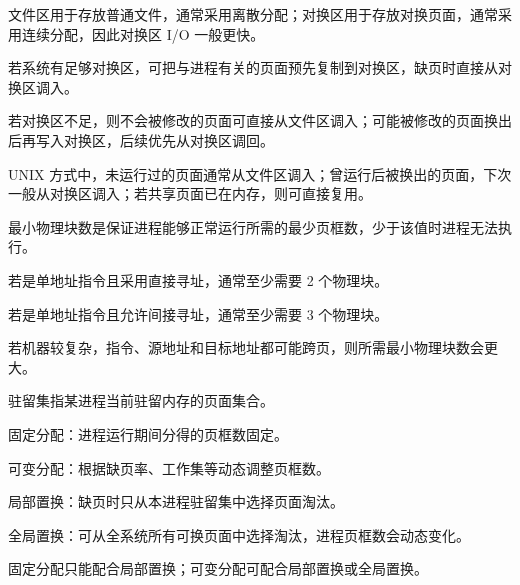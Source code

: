 \begin{points}
  \item 文件区用于存放普通文件，通常采用离散分配；对换区用于存放对换页面，通常采用连续分配，因此对换区 I/O 一般更快。
  \item 若系统有足够对换区，可把与进程有关的页面预先复制到对换区，缺页时直接从对换区调入。
  \item 若对换区不足，则不会被修改的页面可直接从文件区调入；可能被修改的页面换出后再写入对换区，后续优先从对换区调回。
  \item UNIX 方式中，未运行过的页面通常从文件区调入；曾运行后被换出的页面，下次一般从对换区调入；若共享页面已在内存，则可直接复用。
\end{points}

\begin{points}
  \item 最小物理块数是保证进程能够正常运行所需的最少页框数，少于该值时进程无法执行。
  \item 若是单地址指令且采用直接寻址，通常至少需要 2 个物理块。
  \item 若是单地址指令且允许间接寻址，通常至少需要 3 个物理块。
  \item 若机器较复杂，指令、源地址和目标地址都可能跨页，则所需最小物理块数会更大。
\end{points}

\begin{points}
  \item 驻留集指某进程当前驻留内存的页面集合。
  \item 固定分配：进程运行期间分得的页框数固定。
  \item 可变分配：根据缺页率、工作集等动态调整页框数。
\end{points}


\begin{points}
  \item 局部置换：缺页时只从本进程驻留集中选择页面淘汰。
  \item 全局置换：可从全系统所有可换页面中选择淘汰，进程页框数会动态变化。
  \item 固定分配只能配合局部置换；可变分配可配合局部置换或全局置换。
\end{points}


